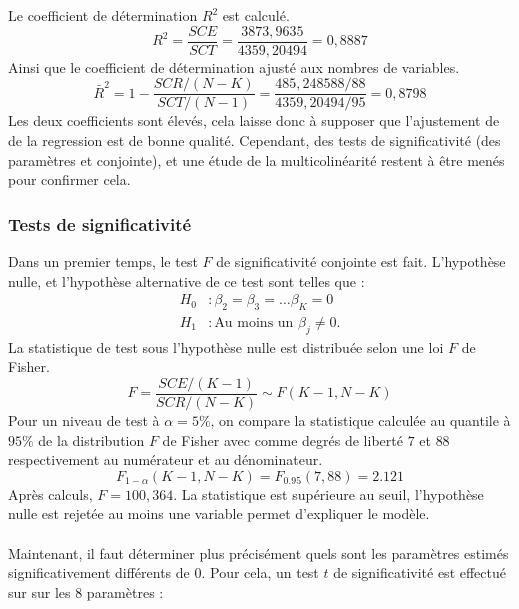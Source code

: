 \documentclass{article}
\begin{document}
Le coefficient de détermination $R^{2}$ est calculé.
\begin{equation*}
    R^{2} = \frac{SCE}{SCT} = \frac{3873,9635}{4359,20494} = 0,8887
\end{equation*}
Ainsi que le coefficient de détermination ajusté aux nombres de variables.
\begin{equation*}
    \bar{R}^{2} = 1 - \frac{SCR/(N-K)}{SCT/(N-1)} = \frac{485,248588/88}{4359,20494/95} = 0,8798
\end{equation*}
Les deux coefficients sont élevés, cela laisse donc à supposer que l'ajustement de de la regression est de bonne qualité. Cependant, des tests de 
significativité (des paramètres et conjointe), et une étude de la multicolinéarité restent à être menés pour confirmer cela.
\subsubsection{Tests de significativité}
\label{sec:testSigni1}
Dans un premier temps, le test $F$ de significativité conjointe est fait. L'hypothèse nulle, et l'hypothèse alternative de ce test sont telles que :
\begin{equation*}
\begin{split}
    H_0 &: \beta_2 = \beta_3 = \dots \beta_K =0 \\
    H_1 &: \text{Au moins un }\beta_j \neq 0.
\end{split}
\end{equation*}
La statistique de test sous l'hypothèse nulle est distribuée selon une loi $F$ de Fisher.
\begin{equation*}
    F = \frac{SCE/(K-1)}{SCR/(N-K)} \sim F(K-1, N-K)
\end{equation*}
Pour un niveau de test à $\alpha = 5\%$, on compare la statistique calculée au quantile à $95\%$ de la distribution $F$ de Fisher avec 
comme degrés de liberté $7$ et $88$ respectivement au numérateur et au dénominateur. 
\begin{equation*}
    F_{1-\alpha} (K-1, N-K) = F_{0.95}(7, 88) = 2.121
\end{equation*}
Après calculs, $F = 100,364$. La statistique est supérieure au seuil, l'hypothèse nulle est rejetée au moins une variable permet d'expliquer le modèle.
\\ \\
Maintenant, il faut déterminer plus précisément quels sont les paramètres estimés significativement différents de 0. Pour cela, un test $t$ de 
significativité est effectué sur sur les $8$ paramètres :
\end{document}
